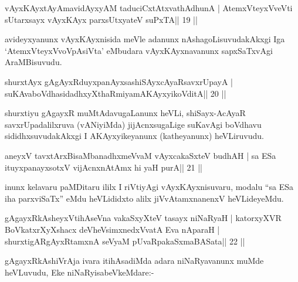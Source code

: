 \begin{shl}
vAyxKAyxtAyAmavidAyxyAM taduciCxtAtxvathAdhunA |
AtemxVteyxVveVti sUtarxsayx vAyxKAyx parxsUtxyateV suPxTA\hfill || 19 ||
\end{shl}

\begin{artha}
avideyxyanunx vAyxKAyxnisida meVle adanunx nAshagoLisuvudakAkxgi Iga `AtemxVteyxVvoVpAsiVta' eMbudara vAyxKAyxnavanunx sapxSaTxvAgi AraMBisuvudu.
\end{artha}


\begin{shl}
shurxtAyx gAgAyxRduyxpanAyxsashiSAyxcAyaRsavxrUpayA |
suKAvaboVdhasidadhxyXthaRmiyamAKAyxyikoVditA\hfill || 20 ||
\end{shl}

\begin{artha}
shurxtiyu gAgayxR muMtAdavugaLanunx heVLi, shiSayx-AcAyaR savxrUpadalilxruva (vANiyiMda) jijAcnxsugaLige suKavAgi boVdhavu sididhxsuvudakAkxgi I AKAyxyikeyanunx (katheyanunx) heVLiruvudu.
\end{artha}


\begin{shl}
aneyxV tavxtArxBisaMbanadhxmeVvaM vAyxcakaSxteV budhAH |
sa ESa ituyxpanayxsotxV vijAcnxnAtAmx hi yaH purA\hfill || 21 ||
\end{shl}

\begin{artha}
inunx kelavaru paMDitaru ililx I riVtiyAgi vAyxKAyxnisuvaru, modalu ``sa ESa iha parxviSaTx'' eMdu heVLididxto alilx jiVvAtamxnanenxV heVLideyeMdu.
\end{artha}


\begin{shl}
gAgayxRkAsheyxVtihAseVna vakaSxyXteV tasayx niNaRyaH |
katorxyXVR BoVkatxrXyXshacx deVheV\s simxnedxVvatA Eva nAparaH |
shurxtigARgAyxRtamxnA seVyaM pUvaRpakaSxmaBASata\hfill || 22 ||
\end{shl}

\begin{artha}
gAgayxRkAshiVrAja ivara itihAsadiMda adara niNaRyavanunx muMde heVLuvudu, Eke niNaRyisabeVkeMdare:-
\end{artha} 
 
